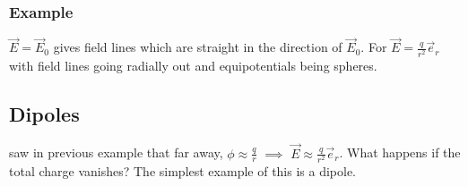 \subsubsection*{Example}

$\vec{E} = \vec{E}_0$ gives field lines which are straight in the direction of $\vec{E}_0$. For $\vec{E} = \frac{q}{r^2} \vec{e}_r$ with field lines going radially out and equipotentials being spheres.

\subsection{Dipoles}

saw in previous example that far away, $\phi \approx \frac{q}{r}$ $\implies$ $\vec{E} \approx \frac{q}{r^2}\vec{e}_r$. What happens if the total charge vanishes? The simplest example of this is a dipole.
